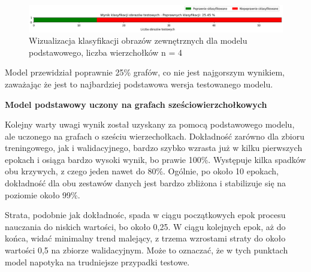 \begin{figure}[ht]
	\centering
	\includegraphics[width=14cm]{resources/tests/images/v3/base4_bar.png}
	\caption{Wizualizacja klasyfikacji obrazów zewnętrznych dla modelu podstawowego, liczba wierzchołków n = 4}
	\label{Fig:tests-base-1c}
\end{figure}
\FloatBarrier

Model przewidział poprawnie 25\% grafów, co nie jest najgorszym wynikiem,
zaważając że jest to najbardziej podstawowa wersja testowanego modelu.




\textbf{Model podstawowy uczony na grafach sześciowierzchołkowych}

Kolejny warty uwagi wynik został uzyskany za pomocą podstawowego modelu, ale uczonego na grafach o sześciu wierzechołkach.
Dokładność zarówno dla zbioru treningowego, jak i walidacyjnego, bardzo szybko wzrasta już w kilku pierwszych epokach
i osiąga bardzo wysoki wynik, bo prawie 100\%.
Występuje kilka spadków obu krzywych, z czego jeden nawet do 80\%.
Ogólnie, po około 10 epokach, dokładność dla obu zestawów danych jest bardzo zbliżona i stabilizuje się na poziomie około 99\%.

Strata, podobnie jak dokładnośc, spada w ciągu początkowych epok procesu nauczania do niskich wartości, bo około 0,25.
W ciągu kolejnych epok, aż do końca, widać minimalny trend malejący, z trzema wzrostami straty do około wartości 0,5 na zbiorze walidacyjnym.
Może to oznaczać, że w tych punktach model napotyka na trudniejsze przypadki testowe.


